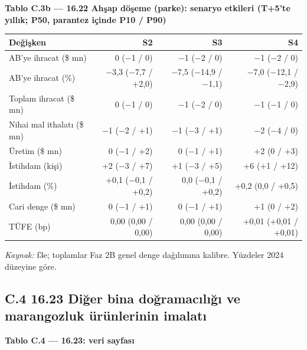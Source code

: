 \endgroup


\textbf{Tablo C.3b --- 16.22 Ahşap döşeme (parke): senaryo etkileri (T+5'te yıllık; P50, parantez içinde P10 / P90)}

\nopagebreak[4]

\begingroup\gbtablo\small

\begin{longtable}[]{@{}lrrr@{}}
\toprule\noalign{}
\textbf{Değişken} & \textbf{S2} & \textbf{S3} & \textbf{S4} \\
\midrule\noalign{}
\endhead
\bottomrule\noalign{}
\endlastfoot
AB'ye ihracat (\$ mn) & 0 (−1 / 0) & −1 (−2 / 0) & −1 (−2 / 0) \\
AB'ye ihracat (\%) & −3,3 (−7,7 / +2,0) & −7,5 (−14,9 / −1,1) & −7,0 (−12,1 / −2,9) \\
Toplam ihracat (\$ mn) & 0 (−1 / 0) & −1 (−2 / 0) & −1 (−1 / 0) \\
Nihai mal ithalatı (\$ mn) & −1 (−2 / +1) & −1 (−3 / +1) & −2 (−4 / 0) \\
Üretim (\$ mn) & 0 (−1 / +2) & 0 (−1 / +1) & +2 (0 / +3) \\
İstihdam (kişi) & +2 (−3 / +7) & +1 (−3 / +5) & +6 (+1 / +12) \\
İstihdam (\%) & +0,1 (−0,1 / +0,2) & 0,0 (−0,1 / +0,2) & +0,2 (0,0 / +0,5) \\
Cari denge (\$ mn) & 0 (−1 / +1) & 0 (−1 / +1) & +1 (0 / +2) \\
TÜFE (bp) & 0,00 (0,00 / 0,00) & 0,00 (0,00 / 0,00) & +0,01 (+0,01 / +0,01) \\
\end{longtable}

\endgroup

\emph{Kaynak:} \etiketT{} f3e; toplamlar Faz 2B genel denge dağılımına kalibre. Yüzdeler 2024 düzeyine göre.

\hypertarget{nace_kartlar_16-18-c4-1623-diux11fer-bina-doux11framacux131lux131ux11fux131-ve-marangozluk-uxfcruxfcnlerinin-imalatux131}{%
\subsection{C.4 16.23 Diğer bina doğramacılığı ve marangozluk ürünlerinin imalatı}\label{nace_kartlar_16-18-c4-1623-diux11fer-bina-doux11framacux131lux131ux11fux131-ve-marangozluk-uxfcruxfcnlerinin-imalatux131}}


\textbf{Tablo C.4 --- 16.23: veri sayfası}

